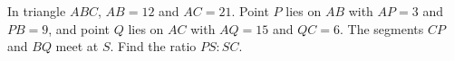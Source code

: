 In triangle $ABC$, $AB=12$ and $AC=21$. Point $P$ lies on $AB$ with $AP=3$ and $PB=9$, and point $Q$ lies on $AC$ with $AQ=15$ and $QC=6$. The segments $CP$ and $BQ$ meet at $S$. Find the ratio $PS:SC$.
